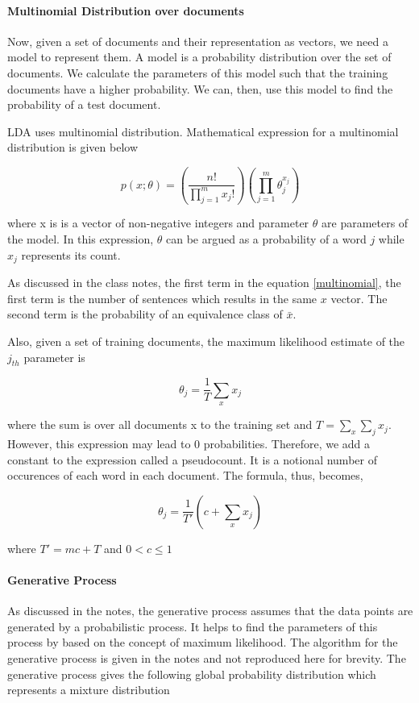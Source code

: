 \documentclass[11pt,a4paper,oneside]{article}
\begin{document}
\paragraph{Multinomial Distribution over documents}
Now, given a set of documents and their representation as vectors, we need a model to represent them. A model is a probability distribution over the set of documents. We calculate the parameters of this model such that the training documents have a higher probability. We can, then, use this model to find the probability of a test document.

LDA uses multinomial distribution. Mathematical expression for a multinomial distribution is given below

\begin{equation}\label{multinomial}
p(x;\theta) = (\frac{n!}{\prod^m_{j=1}x_j!})(\prod^m_{j=1}\theta^{x_j}_j)
\end{equation}

where x is is a vector of non-negative integers and parameter $\theta$ are parameters of the model. In this expression, $\theta$ can be argued as a probability of a word $j$ while $x_j$ represents its count.

As discussed in the class notes, the first term in the equation \ref{multinomial}, the first term is the number of sentences which results in the same $x$ vector. The second term is the probability of an equivalence class of $\bar{x}$.

Also, given a set of training documents, the maximum likelihood estimate of the $j_{th}$ parameter is

\begin{equation}
\theta_j = \frac{1}{T} \sum_x x_j
\end{equation}

where the sum is over all documents x to the training set and $T = \sum_x{\sum_j{x_j}} $. However, this expression may lead to $0$ probabilities. Therefore, we add a constant to the expression called a pseudocount. It is a notional number of occurences of each word in each document. The formula, thus, becomes,

\begin{equation}
\theta_j = \frac{1}{T'} (c + \sum_x x_j)
\end{equation}

where $T' = mc + T$ and $0 < c \leq 1 $
\paragraph{Generative Process}
As discussed in the notes, the generative process assumes that the data points are generated by a probabilistic process. It helps to find the parameters of this process by based on the concept of maximum likelihood. The algorithm for the generative process is given in the notes\cite{classNotes} and not reproduced here for brevity. The generative process gives the following global probability distribution which represents a mixture distribution
\end{document}
